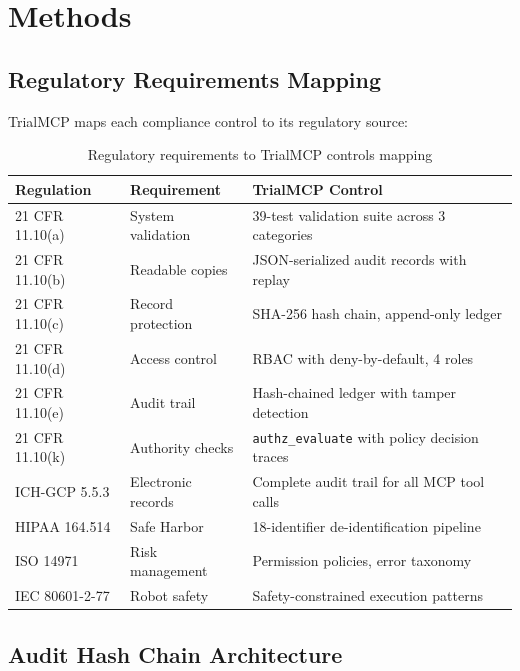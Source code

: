 \documentclass[10pt,letterpaper]{article}
\begin{document}
\section{Methods}

\subsection{Regulatory Requirements Mapping}

TrialMCP maps each compliance control to its regulatory source:

\begin{table}[H]
\centering
\caption{Regulatory requirements to TrialMCP controls mapping}
\label{tab:regmap}
\small
\begin{tabularx}{\textwidth}{l l X}
\toprule
\textbf{Regulation} & \textbf{Requirement} & \textbf{TrialMCP Control} \\
\midrule
21 CFR 11.10(a) & System validation & 39-test validation suite across 3 categories \\
21 CFR 11.10(b) & Readable copies & JSON-serialized audit records with replay \\
21 CFR 11.10(c) & Record protection & SHA-256 hash chain, append-only ledger \\
21 CFR 11.10(d) & Access control & RBAC with deny-by-default, 4 roles \\
21 CFR 11.10(e) & Audit trail & Hash-chained ledger with tamper detection \\
21 CFR 11.10(k) & Authority checks & \texttt{authz\_evaluate} with policy decision traces \\
ICH-GCP 5.5.3 & Electronic records & Complete audit trail for all MCP tool calls \\
HIPAA 164.514 & Safe Harbor & 18-identifier de-identification pipeline \\
ISO 14971 & Risk management & Permission policies, error taxonomy \\
IEC 80601-2-77 & Robot safety & Safety-constrained execution patterns \\
\bottomrule
\end{tabularx}
\end{table}

\subsection{Audit Hash Chain Architecture}
\end{document}
